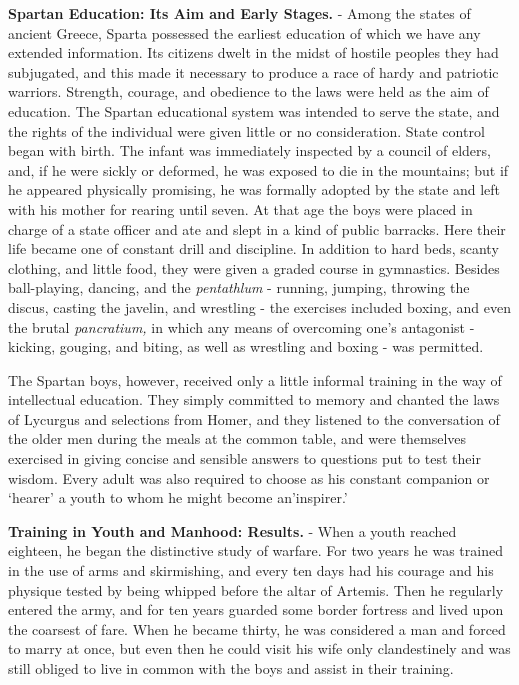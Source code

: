 \documentclass[]{book}
\begin{document}
\textbf{Spartan Education: Its Aim and Early Stages.} - Among the states of ancient Greece, Sparta possessed the earliest education of which we have any extended information. Its citizens dwelt in the midst of hostile peoples they had subjugated, and this made it necessary to produce a race of hardy and patriotic warriors. Strength, courage, and obedience to the laws were held as the aim of education. The Spartan educational system was intended to serve the state, and the rights of the individual were given little or no consideration. State control began with birth. The infant was immediately inspected by a council of elders, and, if he were sickly or deformed, he was exposed to die in the mountains; but if he appeared physically promising, he was formally adopted by the state and left with his mother for rearing until seven. At that age the boys were placed in charge of a state officer and ate and slept in a kind of public barracks. Here their life became one of constant drill and discipline. In addition to hard beds, scanty clothing, and little food, they were given a graded course in gymnastics. Besides ball-playing, dancing, and the \emph{pentathlum} - running, jumping, throwing the discus, casting the javelin, and wrestling - the exercises included boxing, and even the brutal \emph{pancratium,} in which any means of overcoming one's antagonist - kicking, gouging, and biting, as well as wrestling and boxing - was permitted.

The Spartan boys, however, received only a little informal training in the way of intellectual education. They simply committed to memory and chanted the laws of Lycurgus and selections from Homer, and they listened to the conversation of the older men during the meals at the common table, and were themselves exercised in giving concise and sensible answers to questions put to test their wisdom. Every adult was also required to choose as his constant companion or `hearer' a youth to whom he might become an'inspirer.'

\textbf{Training in Youth and Manhood: Results.} - When a youth reached eighteen, he began the distinctive study of warfare. For two years he was trained in the use of arms and skirmishing, and every ten days had his courage and his physique tested by being whipped before the altar of Artemis. Then he regularly entered the army, and for ten years guarded some border fortress and lived upon the coarsest of fare. When he became thirty, he was considered a man and forced to marry at once, but even then he could visit his wife only clandestinely and was still obliged to live in common with the boys and assist in their training.
\end{document}
